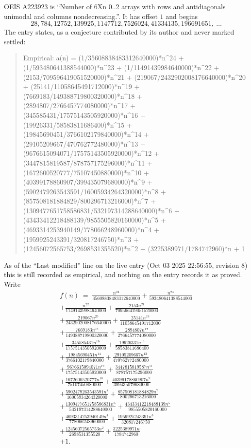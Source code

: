 \documentclass[11pt,a4paper]{article}
\theoremstyle{plain}
\theoremstyle{definition}
\begin{document}
OEIS A223923 is ``Number of 6Xn 0..2 arrays with rows and antidiagonals unimodal and columns nondecreasing.''. It has offset $1$ and begins
\[
28, 784, 12752, 139925, 1147712, 7526024, 41334135, 196691651,\ \dots
\]
The entry states, as a conjecture contributed by its author and never marked settled:
\begin{quote}\raggedright\small
Empirical: a(n) = (1/35608838483312640000)*n\^{}24 + (1/593480641388544000)*n\^{}23 + (1/11491439984640000)*n\^{}22 + (2153/709596419051520000)*n\^{}21 + (219067/2432902008176640000)*n\^{}20 + (25141/11058645491712000)*n\^{}19 + (7669183/149388719800320000)*n\^{}18 + (2894807/2766457774080000)*n\^{}17 + (345585431/17575143505920000)*n\^{}16 + (19926331/58583811686400)*n\^{}15 + (19845690451/3766102179840000)*n\^{}14 + (29105209667/470762772480000)*n\^{}13 + (9676615094071/17575143505920000)*n\^{}12 + (3447815819587/878757175296000)*n\^{}11 + (1672600520777/75107450880000)*n\^{}10 + (40399178860907/399435079680000)*n\^{}9 + (5902479263543591/16005934264320000)*n\^{}8 + (857508181884829/800296713216000)*n\^{}7 + (1309477651758586831/532197314288640000)*n\^{}6 + (43433412218488139/9855505820160000)*n\^{}5 + (4693314253940149/778066248960000)*n\^{}4 + (1959925243391/320817246750)*n\^{}3 + (12456072565753/2698531355520)*n\^{}2 + (3225389971/1784742960)*n + 1
\end{quote}
As of the ``Last modified'' line on the live entry (Oct 03 2025 22:56:55, revision 8) this is still
recorded as empirical, and nothing on the entry records it as proved. Write
\begin{multline*}
f(n)\;=\;\frac{n^{24}}{35608838483312640000} + \frac{n^{23}}{593480641388544000} \\
+ \frac{n^{22}}{11491439984640000} + \frac{2153 n^{21}}{709596419051520000} \\
+ \frac{219067 n^{20}}{2432902008176640000} + \frac{25141 n^{19}}{11058645491712000} \\
+ \frac{7669183 n^{18}}{149388719800320000} + \frac{2894807 n^{17}}{2766457774080000} \\
+ \frac{345585431 n^{16}}{17575143505920000} + \frac{19926331 n^{15}}{58583811686400} \\
+ \frac{19845690451 n^{14}}{3766102179840000} + \frac{29105209667 n^{13}}{470762772480000} \\
+ \frac{9676615094071 n^{12}}{17575143505920000} + \frac{3447815819587 n^{11}}{878757175296000} \\
+ \frac{1672600520777 n^{10}}{75107450880000} + \frac{40399178860907 n^{9}}{399435079680000} \\
+ \frac{5902479263543591 n^{8}}{16005934264320000} + \frac{857508181884829 n^{7}}{800296713216000} \\
+ \frac{1309477651758586831 n^{6}}{532197314288640000} + \frac{43433412218488139 n^{5}}{9855505820160000} \\
+ \frac{4693314253940149 n^{4}}{778066248960000} + \frac{1959925243391 n^{3}}{320817246750} \\
+ \frac{12456072565753 n^{2}}{2698531355520} + \frac{3225389971 n}{1784742960} \\
+ 1.
\end{multline*}
\end{document}
